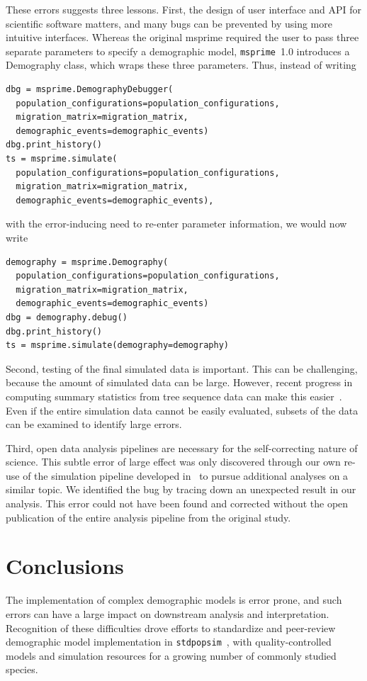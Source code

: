 \documentclass{article}
\newcommand{\msprime}[0]{\texttt{msprime}}
\newcommand{\stdpopsim}[0]{\texttt{stdpopsim}}
\begin{document}
These errors suggests three lessons.
First, the design of user interface and API for scientific software matters,
and many bugs can be prevented by using more intuitive 
interfaces. Whereas the original msprime required the user to pass
three separate parameters to specify a demographic model, \msprime\ 1.0
 introduces a Demography class, which wraps these three parameters.
Thus, instead of writing
\begin{lstlisting}[frame=single]
dbg = msprime.DemographyDebugger(
  population_configurations=population_configurations,
  migration_matrix=migration_matrix,
  demographic_events=demographic_events)
dbg.print_history()
ts = msprime.simulate(
  population_configurations=population_configurations,
  migration_matrix=migration_matrix,
  demographic_events=demographic_events),
\end{lstlisting}
with the error-inducing need to re-enter parameter information,  
we would now write
\begin{lstlisting}[frame=single]
demography = msprime.Demography(
  population_configurations=population_configurations,
  migration_matrix=migration_matrix,
  demographic_events=demographic_events)
dbg = demography.debug()
dbg.print_history()
ts = msprime.simulate(demography=demography)
\end{lstlisting}

Second, testing of the final simulated data is important. This can be challenging,
because the amount of simulated data can be large. However, recent progress in
computing summary statistics from tree sequence data can make this
easier~\citep{ralph2020efficiently}.
Even if the entire simulation data cannot be easily evaluated, subsets of the data
can be examined to identify large errors.

Third, open data analysis pipelines are necessary for the self-correcting nature of science.
This subtle error of large effect was only discovered through our own re-use of
the simulation pipeline developed in~\citep{martin2017human} to pursue
additional analyses on a similar topic. We identified the bug by tracing down an unexpected
result in our analysis. This error could not have been found and corrected without the open
publication of the entire analysis pipeline from the original study.

\section{Conclusions}

The implementation of complex demographic models is error prone, and such errors can 
have a large impact on downstream analysis and interpretation. 
Recognition of these difficulties drove efforts to standardize and peer-review demographic model
implementation in \stdpopsim~\citep{adrion2019community}, with quality-controlled
models and simulation resources for a growing number of commonly studied species. 
\end{document}
